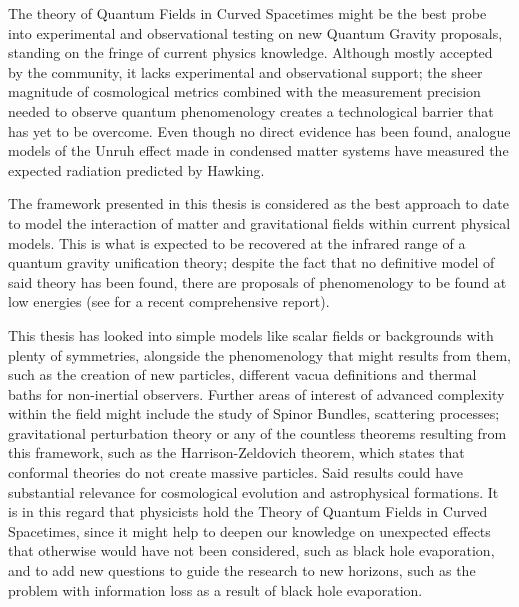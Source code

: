 
The theory of Quantum Fields in Curved Spacetimes might be the best probe into experimental and observational testing on new Quantum Gravity proposals, standing on the fringe of current physics knowledge. Although mostly accepted by the community, it lacks experimental and observational support; the sheer magnitude of cosmological metrics combined with the measurement precision needed to observe quantum phenomenology creates a technological barrier that has yet to be overcome.   Even though no direct evidence has been found, analogue models of the Unruh effect made in condensed matter systems \cite{UnruhExperiment} have measured the expected radiation predicted by Hawking.

\vspace*{0.25cm}
The framework presented in this thesis is considered as the best approach to date to model the interaction of matter and gravitational fields within current physical models. This is what is expected to be recovered at the infrared range of a quantum gravity unification theory; despite the fact that no definitive model of said theory has been found, there are proposals of phenomenology to be found at low energies (see \cite{QGpheno_Report} for a recent comprehensive report).


\vspace*{0.4cm}
This thesis has looked into simple models like scalar fields or backgrounds with plenty of symmetries, alongside the phenomenology that might results from them, such as the creation of new particles, different vacua definitions and thermal baths for non-inertial observers. Further areas of interest of advanced complexity within the field might include the study of Spinor Bundles, scattering processes; gravitational perturbation theory or any of the countless theorems resulting from this framework, such as the Harrison-Zeldovich theorem, which states that conformal theories do not create massive particles. Said results could have substantial relevance for cosmological evolution and astrophysical formations. It is in this regard that physicists hold the Theory of Quantum Fields in Curved Spacetimes, since it might help to deepen our knowledge on unexpected effects that otherwise would have not been considered, such as black hole evaporation, and to add new questions to guide the research to new horizons, such as the problem with information loss as a result of black hole evaporation.

